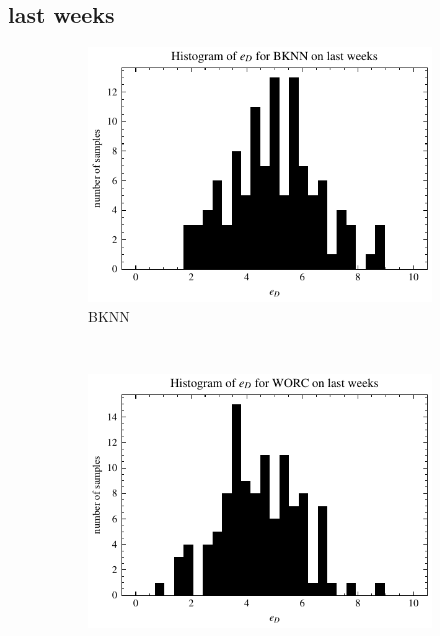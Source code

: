 \subsection{last weeks}

\begin{figure}[ht]
    \centering
    \begin{subfigure}[t]{0.5\textwidth}
        \centering
        \includegraphics[width=\textwidth]{chapters/figures/result_histograms/result_histogram_last_weeks_workload_dist_error_BKNN.pdf}
        \captionsetup{width=.9\linewidth}
        \caption{BKNN}
    \end{subfigure}%
    ~ 
    \begin{subfigure}[t]{0.5\textwidth}
        \centering
        \includegraphics[width=\textwidth]{chapters/figures/result_histograms/result_histogram_last_weeks_workload_dist_error_WORC.pdf}

\end{subfigure}
\end{figure}
